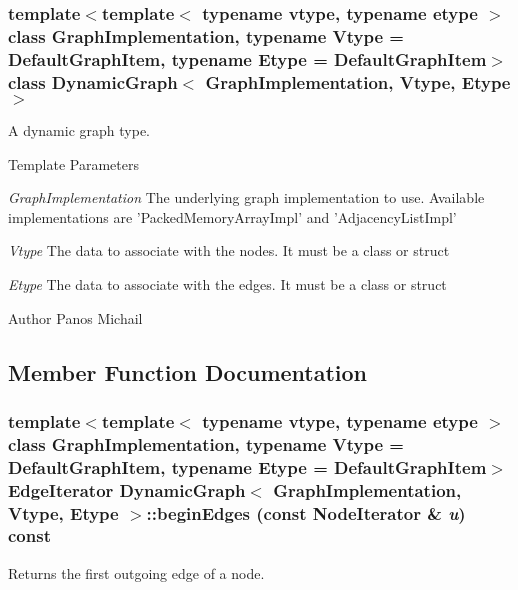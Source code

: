 \subsubsection*{template$<$template$<$ typename vtype, typename etype $>$ class GraphImplementation, typename Vtype = DefaultGraphItem, typename Etype = DefaultGraphItem$>$ class DynamicGraph$<$ GraphImplementation, Vtype, Etype $>$}

A dynamic graph type. 
\begin{DoxyTemplParams}{Template Parameters}
\item[{\em GraphImplementation}]The underlying graph implementation to use. Available implementations are 'PackedMemoryArrayImpl' and 'AdjacencyListImpl' \item[{\em Vtype}]The data to associate with the nodes. It must be a class or struct \item[{\em Etype}]The data to associate with the edges. It must be a class or struct \end{DoxyTemplParams}
\begin{DoxyAuthor}{Author}
Panos Michail 
\end{DoxyAuthor}


\subsection{Member Function Documentation}
\hypertarget{class_dynamic_graph_af82c60cd82a12a965679d38d410e33f0}{
\subsubsection[{beginEdges}]{\setlength{\rightskip}{0pt plus 5cm}template$<$template$<$ typename vtype, typename etype $>$ class GraphImplementation, typename Vtype  = DefaultGraphItem, typename Etype  = DefaultGraphItem$>$ EdgeIterator {\bf DynamicGraph}$<$ GraphImplementation, Vtype, Etype $>$::beginEdges (const NodeIterator \& {\em u}) const}}
\label{class_dynamic_graph_af82c60cd82a12a965679d38d410e33f0}


Returns the first outgoing edge of a node. 


